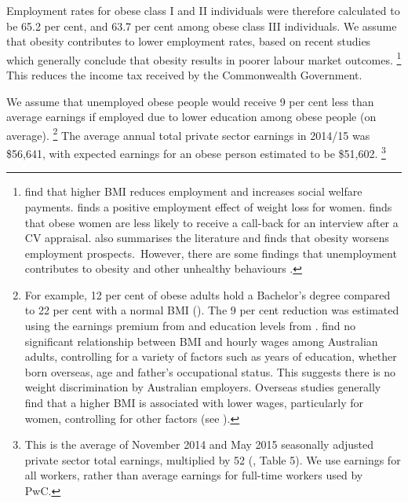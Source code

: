 \documentclass[embargoed]{grattan}
\begin{document}
Employment rates for obese class I and II individuals were therefore calculated to be 65.2 per cent, and 63.7 per cent among obese class III individuals.
We assume that obesity contributes to lower employment rates, based on recent studies which generally conclude that obesity results in poorer labour market outcomes.%
\footnote{\textcite{Boeckerman2016EffectWeightLabor} find that higher BMI reduces employment and increases social welfare payments. \textcite{Reichert2015Obesityweightloss} finds a positive employment effect of weight loss for women. \textcite{Rooth2009Obesityattractivenessdifferential} finds that obese women are less likely to receive a call-back for an interview after a CV appraisal. \textcite{Cawley2015economyscalesselective} also summarises the literature and finds that obesity worsens employment prospects.~However, there are some findings that unemployment contributes to obesity and other unhealthy behaviours \textcites{Schmeiser2009Expandingwalletswaistlines}{Marcus2014Doesjobloss}.} This reduces the income tax received by the Commonwealth Government.

We assume that unemployed obese people would receive 9 per cent less than average earnings if employed due to lower education among obese people (on average).%
\footnote{For example, 12 per cent of obese adults hold a Bachelor’s degree compared to 22 per cent with a normal BMI (\textcite{ABS20164364055011AustralianHealth}).
The 9 per cent reduction was estimated using the earnings premium from \textcite{Norton2012MappingAustralianhigher} and education levels from \textcite{ABS2013436405503AustralianHealth}. \textcite{Kortt2010Doessizematter} find no significant relationship between BMI and hourly wages among Australian adults, controlling for a variety of factors such as years of education, whether born overseas, age and father’s occupational status.
This suggests there is no weight discrimination by Australian employers.
Overseas studies generally find that a higher BMI is associated with lower wages, particularly for women, controlling for other factors (see \textcites{Cawley2004impactobesitywages}{Cawley2005comparisonrelationshipobesity}).} 
The average annual total private sector earnings in 2014/15 was \$56,641, with expected earnings for an obese person estimated to be \$51,602.%
\footnote{This is the average of November 2014 and May 2015 seasonally adjusted private sector total earnings, multiplied by 52 (\textcite{ABS201663020AverageWeekly}, Table 5).
We use earnings for all workers, rather than average earnings for full-time workers used by PwC.}  
\end{document}
